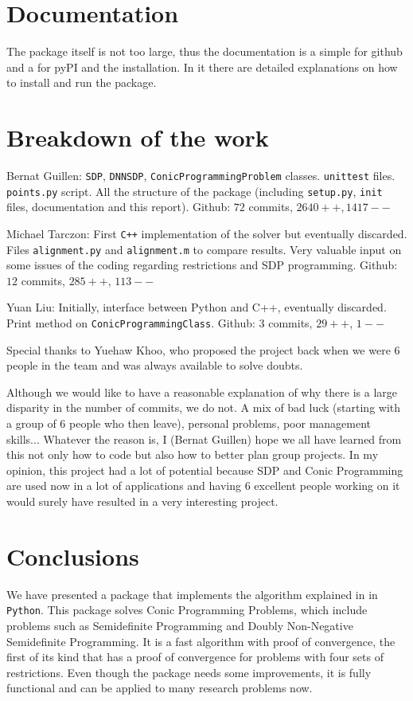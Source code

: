 \documentclass[paper=a4, fontsize=11pt]{scrartcl}
\numberwithin{equation}{section}		%
\numberwithin{figure}{section}			%
\numberwithin{table}{section}				%
\begin{document}
\section{Documentation}
The package itself is not too large, thus the documentation is a simple  for github and a  for pyPI and the installation. In it there are detailed explanations on how to install and run the package.

\section{Breakdown of the work}
Bernat Guillen: \texttt{SDP}, \texttt{DNNSDP}, \texttt{ConicProgrammingProblem} classes. \texttt{unittest} files. \texttt{points.py} script. All the structure of the package (including \texttt{setup.py}, \texttt{init} files, documentation and this report). Github: $72$ commits, $2640 ++, 1417--$

Michael Tarczon: First \texttt{C++} implementation of the solver but eventually discarded. Files \texttt{alignment.py} and \texttt{alignment.m} to compare results. Very valuable input on some issues of the coding regarding restrictions and SDP programming. Github: $12$ commits, $285++$, $113--$

Yuan Liu: Initially, interface between Python and C++, eventually discarded. Print method on \texttt{ConicProgrammingClass}. Github: $3$ commits, $29++$, $1--$

Special thanks to Yuehaw Khoo, who proposed the project back when we were 6 people in the team and was always available to solve doubts.

Although we would like to have a reasonable explanation of why there is a large disparity in the number of commits, we do not. A mix of bad luck (starting with a group of 6 people who then leave), personal problems, poor management skills... Whatever the reason is, I (Bernat Guillen) hope we all have learned from this not only how to code but also how to better plan group projects. In my opinion, this project had a lot of potential because SDP and Conic Programming are used now in a lot of applications and having 6 excellent people working on it would surely have resulted in a very interesting project. 

\section{Conclusions}

We have presented a package that implements the algorithm explained in \cite{sun2014} in \texttt{Python}. This package solves Conic Programming Problems, which include problems such as Semidefinite Programming and Doubly Non-Negative Semidefinite Programming. It is a fast algorithm with proof of convergence, the first of its kind that has a proof of convergence for problems with four sets of restrictions. Even though the package needs some improvements, it is fully functional and can be applied to many research problems now. 
\end{document}
